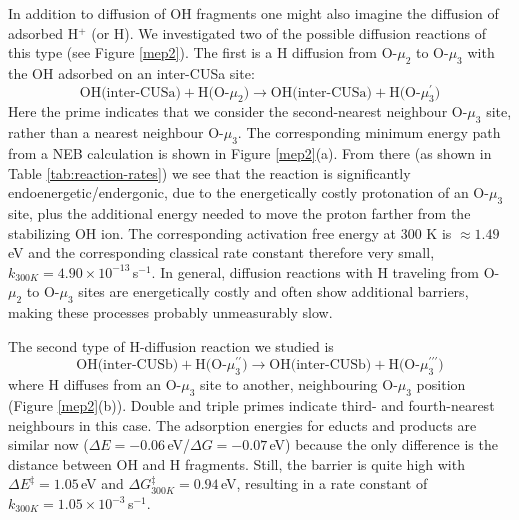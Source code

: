\documentclass[twoside,twocolumn,9pt]{article}
\begin{document}
In addition to diffusion of OH fragments one might also imagine the diffusion of adsorbed H$^+$ (or H). We investigated two of the possible diffusion reactions of this type (see Figure \ref{mep2}). The first is a H 
 diffusion from O-$\mu_2$ to  O-$\mu_3$ with the OH adsorbed on an inter-CUSa site:
 \begin{equation}
 \text{OH(inter-CUSa)} + \text{H(O-$\mu_2$)}
  \rightarrow \text{OH(inter-CUSa)} + \text{H(O-$\mu_3^\prime$)} \tag{Df-H-V}
     \label{diffH5}
\end{equation}
Here the prime indicates that we consider the second-nearest neighbour O-$\mu_3$ site, rather than a nearest neighbour O-$\mu_3$.
 The corresponding minimum energy path from a NEB calculation
 is shown in Figure \ref{mep2}(a).
 From there (as shown in 
Table \ref{tab:reaction-rates}) 
 we  see that the reaction is significantly endoenergetic/endergonic, 
 due to the energetically costly protonation of an O-$\mu_3$ site, plus the additional energy needed to move the proton farther from the  stabilizing OH ion. The corresponding activation free energy at 300 K is $\approx 1.49\,$eV and the corresponding classical rate constant therefore very small, $k_{300K}=4.90\times 10^{-13}\,$s$^{-1}$.
 {\color{red}In general, diffusion reactions
 with H traveling from O-$\mu_2$ to O-$\mu_3$ sites are energetically 
 costly and often show additional barriers, making 
 these processes probably unmeasurably slow.} 

The second type of H-diffusion reaction we studied is
 \begin{equation}
 \text{OH(inter-CUSb)} + \text{H(O-$\mu_3^{\prime\prime}$)}
  \rightarrow \text{OH(inter-CUSb)} + \text{H(O-$\mu_3^{\prime\prime\prime}$)} \tag{Df-H-VI}
     \label{diffH6}
\end{equation}
where  H diffuses from an O-$\mu_3$ site to another, neighbouring 
  O-$\mu_3$ position (Figure \ref{mep2}(b)). Double and triple primes 
 indicate third- and fourth-nearest neighbours in this 
 case. The adsorption energies for educts and products are similar now
 ($\Delta E=-0.06\,$eV/$\Delta G=-0.07\,$eV) because the only difference is the distance between OH and H fragments. 
 Still, the barrier is quite high with $\Delta E^\ddagger=1.05\,$eV and $\Delta G^\ddagger_{300K}=0.94\,$eV, resulting 
  in a rate constant of $k_{300K}=1.05\times 10^{-3}\,$s$^{-1}$. 
\end{document}
